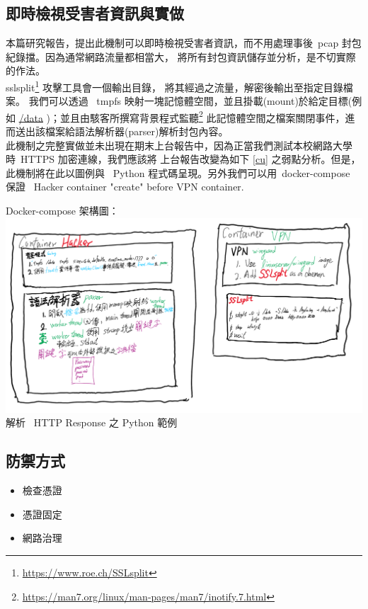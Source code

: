 \documentclass[a4paper]{article}
\begin{document}
\begin{CJK*}{UTF8}{bsmi}
    \subsection{即時檢視受害者資訊與實做}
    本篇研究報告，提出此機制可以即時檢視受害者資訊，而不用處理事後\ pcap 封包紀錄擋。因為通常網路流量都相當大，
    將所有封包資訊儲存並分析，是不切實際的作法。\\

    sslsplit\footnote{\url{https://www.roe.ch/SSLsplit}} 攻擊工具會一個輸出目錄，
    將其經過之流量，解密後輸出至指定目錄檔案。
    我們可以透過 \ tmpfs 映射一塊記憶體空間，並且掛載(mount)於給定目標(例如 \underline{/data}
    )；並且由駭客所撰寫背景程式監聽\footnote{\url{https://man7.org/linux/man-pages/man7/inotify.7.html}}
    此記憶體空間之檔案關閉事件，進而送出該檔案給語法解析器(parser)解析封包內容。\\

    此機制之完整實做並未出現在期末上台報告中，因為正當我們測試本校網路大學時\  HTTPS 加密連線，我們應該將
    上台報告改變為如下 \ref{cu} 之弱點分析。但是，此機制將在此以圖例與 \ Python 程式碼呈現。另外我們可以用\
    docker-compose 保證\ {\color{red} Hacker} container "create" before {\color{green} VPN} container.
    \newpage

    Docker-compose 架構圖：\\
    \includegraphics[width=\textwidth]{images/image_2022-01-18_17-58-35.png}\\
    解析 \ HTTP Response 之 Python 範例
    
    \newpage

    \subsection{防禦方式}
    \begin{itemize}
        \item 檢查憑證
        \item 憑證固定
        \item 網路治理
    \end{itemize}


\end{CJK*}
\end{document}
